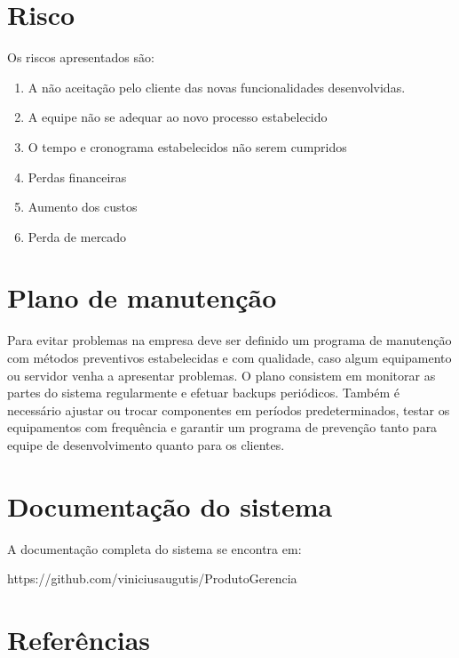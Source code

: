 \documentclass[	DIV=calc,%
							paper=a4,%
							fontsize=12pt,%
							onecolumn]{scrartcl}	 					%
\begin{document}
\section{Risco}
Os riscos apresentados são:

\begin{enumerate}
	\item A não aceitação pelo cliente das novas funcionalidades desenvolvidas.
	\item A equipe não se adequar ao novo processo estabelecido
	\item O tempo e cronograma estabelecidos não serem cumpridos
	\item Perdas financeiras
	\item Aumento dos custos
	\item Perda de mercado
\end{enumerate}

\section{Plano de manutenção}
Para evitar problemas na empresa deve ser definido um programa de manutenção com métodos preventivos estabelecidas e com qualidade, caso algum equipamento ou servidor venha a apresentar problemas. 
O plano consistem em monitorar as partes do sistema regularmente e efetuar backups periódicos. Também é necessário ajustar ou trocar componentes em períodos predeterminados, testar os equipamentos com frequência e garantir um programa de prevenção tanto para equipe de desenvolvimento quanto para os clientes.


\section{Documentação do sistema}
A documentação completa do sistema se encontra em:

https://github.com/viniciusaugutis/ProdutoGerencia

\section{Referências}
\renewcommand\refname{} %

  
\end{document}
